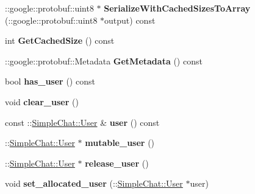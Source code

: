 \begin{DoxyCompactItemize}
\item 
\hypertarget{classSimpleChat_1_1UserChange_a5f6381739d9614534ac32d6e62eed4b8}{\-::google\-::protobuf\-::uint8 $\ast$ {\bfseries Serialize\-With\-Cached\-Sizes\-To\-Array} (\-::google\-::protobuf\-::uint8 $\ast$output) const }\label{classSimpleChat_1_1UserChange_a5f6381739d9614534ac32d6e62eed4b8}

\item 
\hypertarget{classSimpleChat_1_1UserChange_aaa63406f833c90a1cac24c608a5099d4}{int {\bfseries Get\-Cached\-Size} () const }\label{classSimpleChat_1_1UserChange_aaa63406f833c90a1cac24c608a5099d4}

\item 
\hypertarget{classSimpleChat_1_1UserChange_aa1be161ae343c758bd84384af7c2e536}{\-::google\-::protobuf\-::\-Metadata {\bfseries Get\-Metadata} () const }\label{classSimpleChat_1_1UserChange_aa1be161ae343c758bd84384af7c2e536}

\item 
\hypertarget{classSimpleChat_1_1UserChange_af5da96dc70b5bce67e340a5a63b0de58}{bool {\bfseries has\-\_\-user} () const }\label{classSimpleChat_1_1UserChange_af5da96dc70b5bce67e340a5a63b0de58}

\item 
\hypertarget{classSimpleChat_1_1UserChange_a26d586dfd246642576647bbb15ff64e9}{void {\bfseries clear\-\_\-user} ()}\label{classSimpleChat_1_1UserChange_a26d586dfd246642576647bbb15ff64e9}

\item 
\hypertarget{classSimpleChat_1_1UserChange_aa9522674904917b9a6dbf07f8149c2e7}{const \-::\hyperlink{classSimpleChat_1_1User}{Simple\-Chat\-::\-User} \& {\bfseries user} () const }\label{classSimpleChat_1_1UserChange_aa9522674904917b9a6dbf07f8149c2e7}

\item 
\hypertarget{classSimpleChat_1_1UserChange_abe9259ac664c46a1d1a6594bd2a9515a}{\-::\hyperlink{classSimpleChat_1_1User}{Simple\-Chat\-::\-User} $\ast$ {\bfseries mutable\-\_\-user} ()}\label{classSimpleChat_1_1UserChange_abe9259ac664c46a1d1a6594bd2a9515a}

\item 
\hypertarget{classSimpleChat_1_1UserChange_ae05744bd126cdccde182531270124930}{\-::\hyperlink{classSimpleChat_1_1User}{Simple\-Chat\-::\-User} $\ast$ {\bfseries release\-\_\-user} ()}\label{classSimpleChat_1_1UserChange_ae05744bd126cdccde182531270124930}

\item 
\hypertarget{classSimpleChat_1_1UserChange_a7b9d08e07948628ba13a5c85f6cc75a0}{void {\bfseries set\-\_\-allocated\-\_\-user} (\-::\hyperlink{classSimpleChat_1_1User}{Simple\-Chat\-::\-User} $\ast$user)}\label{classSimpleChat_1_1UserChange_a7b9d08e07948628ba13a5c85f6cc75a0}


\end{DoxyCompactItemize}
